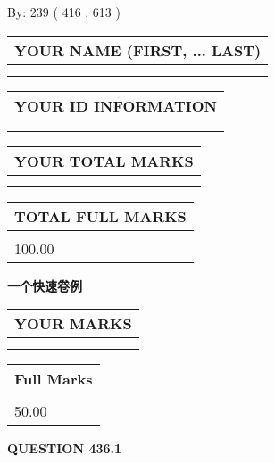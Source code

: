 \documentclass{ctexart}
\begin{document}
   
\hspace{1.0in} By: 
 239 ( 416 ,  613 )
   
   
   
   
\newpage 
\setcounter{page}{ 
   436001 } 
   
   
   
   
\noindent\begin{tabular}{|l|}
\hline
YOUR NAME (FIRST, ... LAST)  \\
\hline
 \\ 
 \\ 
\hline
\end{tabular}
\hspace{0.05in} \begin{tabular}{|l|}
\hline
 YOUR   ID   INFORMATION  \\
\hline
 \\ 
 \\ 
\hline
\end{tabular}
   
   
\vspace{0.2in}\noindent\begin{tabular}{|l|}
\hline
YOUR TOTAL MARKS  \\
\hline
 \\ 
 \\ 
\hline
\end{tabular}
\hspace{0.05in} \begin{tabular}{|l|}
\hline
TOTAL FULL MARKS  \\
\hline
 \\ 
100.00 \\
\hline
\end{tabular}
   
   
 \vspace{0.2in}
{\LARGE {\textbf{ 一个快速卷例}}}
   
   
  
\vspace{0.2in}
  
\noindent\begin{tabular}{|l|}
\hline
 YOUR MARKS  \\
\hline
 \\ 
 \\ 
\hline
\end{tabular}
\hspace{0.05in} \begin{tabular}{|l|}
\hline
 Full Marks  \\
\hline
 \\ 
50.00 \\
\hline
\end{tabular}
{\textbf{\Large{QUESTION
436.1 
}}}
  
\end{document}
